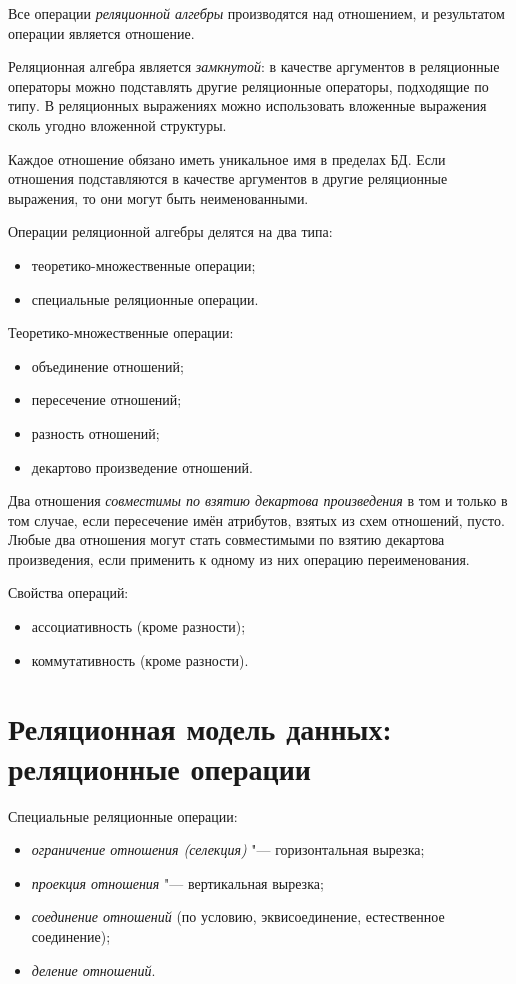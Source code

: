 Все операции \emph{реляционной алгебры} производятся над отношением, и результатом операции является отношение.

Реляционная алгебра является \emph{замкнутой}: в качестве аргументов в реляционные операторы можно подставлять другие реляционные операторы, подходящие по типу.
В реляционных выражениях можно использовать вложенные выражения сколь угодно вложенной структуры.

Каждое отношение обязано иметь уникальное имя в пределах БД.
Если отношения подставляются в качестве аргументов в другие реляционные выражения, то они могут быть неименованными.

Операции реляционной алгебры делятся на два типа:
\begin{itemize}
	\item теоретико-множественные операции;
	\item специальные реляционные операции.
\end{itemize}

Теоретико-множественные операции:
\begin{itemize}
	\item объединение отношений;
	\item пересечение отношений;
	\item разность отношений;
	\item декартово произведение отношений.
\end{itemize}

Два отношения \emph{совместимы по взятию декартова произведения} в том и только в том случае, если пересечение имён атрибутов, взятых из схем отношений, пусто.
Любые два отношения могут стать совместимыми по взятию декартова произведения, если применить к одному из них операцию переименования.

Свойства операций:
\begin{itemize}
	\item ассоциативность (кроме разности);
	\item коммутативность (кроме разности).
\end{itemize}

\section{Реляционная модель данных: реляционные операции}

Специальные реляционные операции:
\begin{itemize}
	\item \emph{ограничение отношения (селекция)} "--- горизонтальная вырезка;
	\item \emph{проекция отношения} "--- вертикальная вырезка;
	\item \emph{соединение отношений} (по условию, эквисоединение, естественное соединение);
	\item \emph{деление отношений}.
\end{itemize}


